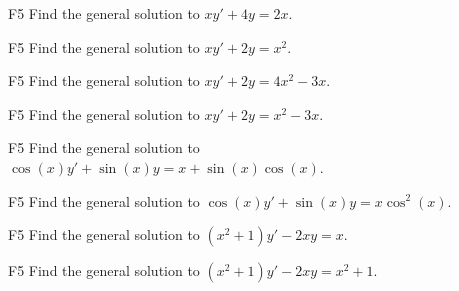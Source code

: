 \begin{problem}{F5}
Find the general solution to \(xy' + 4y = 2x\).
\end{problem}

\begin{problem}{F5}
Find the general solution to \(xy' + 2y = x^2\).
\end{problem}

\begin{problem}{F5}
Find the general solution to \(xy' + 2y = 4x^2-3x\).
\end{problem}

\begin{problem}{F5}
Find the general solution to \(xy' + 2y = x^2-3x\).
\end{problem}

\begin{problem}{F5}
Find the general solution to \(\cos(x) y' + \sin (x)y = x +\sin(x)\cos(x) \).
\end{problem}

\begin{problem}{F5}
Find the general solution to \(\cos(x) y' + \sin (x)y = x \cos^2(x) \).
\end{problem}

\begin{problem}{F5}
Find the general solution to \((x^2+1)y' - 2xy =x \).
\end{problem}

\begin{problem}{F5}
Find the general solution to \((x^2+1)y' - 2xy =x^2+1 \).
\end{problem}
